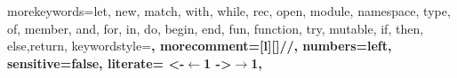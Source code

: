 \usepackage{listings}
\usepackage{color}
                {morekeywords={let, new, match, with, while, rec, open, module, namespace,
type, of, member, and, for, in, do, begin, end, fun, function, try, mutable, if, 
then, else,return}, 
    keywordstyle=\bfseries,
    morecomment=[l][\color{graycomments}]{//},
    numbers=left,
    sensitive=false,
    literate=
        {<-}{$\leftarrow{}$}{1}
        {->}{$\rightarrow{}$}{1},
    }
